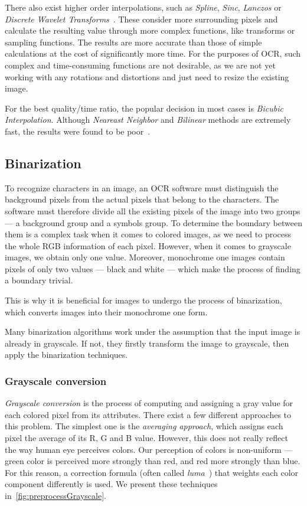 There also exist higher order interpolations, such as \emph{Spline}, \emph{Sinc}, \emph{Lanczos} or \emph{Discrete Wavelet Transforms}~\cite{interpolation}. These consider more surrounding pixels and calculate the resulting value through more complex functions, like transforms or sampling functions. The results are more accurate than those of simple calculations at the cost of significantly more time. For the purposes of OCR, such complex and time-consuming functions are not desirable, as we are not yet working with any rotations and distortions and just need to resize the existing image.

For the best quality/time ratio, the popular decision in most cases is \emph{Bicubic Interpolation}. Although \emph{Neareast Neighbor} and \emph{Bilinear} methods are extremely fast, the results were found to be poor~\cite{interpolationComp}.

\subsection{Binarization}

To recognize characters in an image, an OCR software must distinguish the background pixels from the actual pixels that belong to the characters. The software must therefore divide all the existing pixels of the image into two groups --- a background group and a symbols group. To determine the boundary between them is a complex task when it comes to colored images, as we need to process the whole RGB information of each pixel. However, when it comes to grayscale images, we obtain only one value. Moreover, monochrome one images contain pixels of only two values --- black and white --- which make the process of finding a boundary trivial.

This is why it is beneficial for images to undergo the process of binarization, which converts images into their monochrome one form.

Many binarization algorithms work under the assumption that the input image is already in grayscale. If not, they firstly transform the image to grayscale, then apply the binarization techniques.

\subsubsection{Grayscale conversion}

\emph{Grayscale conversion} is the process of computing and assigning a gray value for each colored pixel from its attributes. There exist a few different approaches to this problem. The simplest one is the \emph{averaging approach}, which assigns each pixel the average of its R, G and B value. However, this does not really reflect the way human eye perceives colors. Our perception of colors is non-uniform --- green color is perceived more strongly than red, and red more strongly than blue. For this reason, a correction formula (often called \emph{luma}~\cite{grayscaleConv}) that weights each color component differently is used. We present these techniques in~\cref{fig:preprocessGrayscale}.

